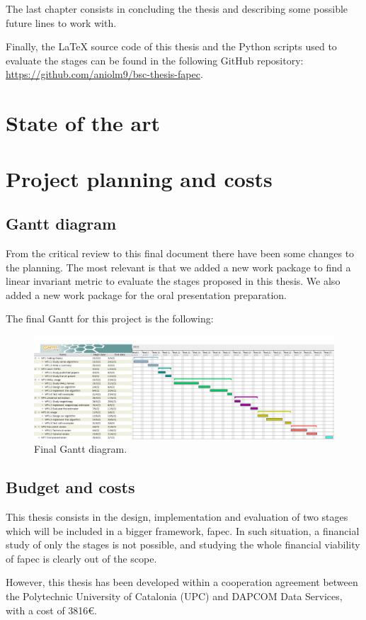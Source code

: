The last chapter consists in concluding the thesis and describing some possible future lines to work with.

Finally, the LaTeX source code of this thesis and the Python scripts used to evaluate the stages can be found in the following GitHub repository: \url{https://github.com/aniolm9/bsc-thesis-fapec}.

\section{State of the art}


\section{Project planning and costs}
\subsection{Gantt diagram}
From the critical review to this final document there have been some changes to the planning. The most relevant is that we added a new work package to find a linear invariant metric to evaluate the stages proposed in this thesis. We also added a new work package for the oral presentation preparation.

The final Gantt for this project is the following:
\begin{figure}[h!]
	\begin{center}
		\includegraphics[scale=0.255]{images/gantt.png}
	\end{center}
	\caption{Final Gantt diagram.}
	\label{fig:gantt}
\end{figure}

\subsection{Budget and costs}
This thesis consists in the design, implementation and evaluation of two stages which will be included in a bigger framework, \acrshort{fapec}. In such situation, a financial study of only the stages is not possible, and studying the whole financial viability of \acrshort{fapec} is clearly out of the scope.

However, this thesis has been developed within a cooperation agreement between the Polytechnic University of Catalonia (UPC) and DAPCOM Data Services, with a cost of 3816€.
